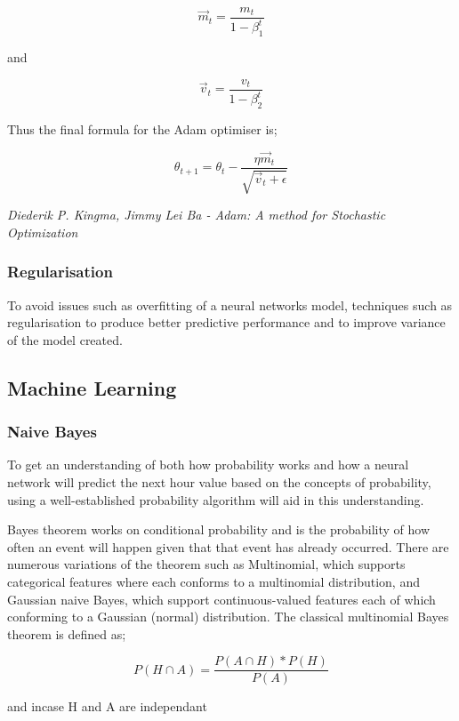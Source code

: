 \documentclass[oneside, 12pt]{article}
\begin{document}
\begin{itemize}
				\[ \vec{m}_t = \frac{m_t}{1 - \beta^t_1} \] 
				\begin{center}
					and
				\end{center}				
				\[\vec{v}_t = \frac{v_t}{1 - \beta^t_2} \]
				
				Thus the final formula for the Adam optimiser is;
				
				\[\theta_{t+1} = \theta_t - \frac{\eta \vec{m}_t}{\sqrt{\vec{v}_t + \epsilon}} \]
				
				\begin{center}
					\textit{Diederik P. Kingma, Jimmy Lei Ba - Adam: A method for Stochastic Optimization}\cite{Adam}
				\end{center}
			\end{itemize}
		
		\subsubsection{Regularisation}
		To avoid issues such as overfitting of a neural networks model, techniques such as regularisation to produce better predictive performance and to improve variance of the model created. \cite{RegularisationSc}
		
		\subsection{Machine Learning}\label{machine}
			\subsubsection{Naive Bayes}
			To get an understanding of both how probability works and how a neural network will predict the next hour value based on the concepts of probability, using a well-established probability algorithm will aid in this understanding.
			
			Bayes theorem works on conditional probability and is the probability of how often an event will happen given that that event has already occurred. There are numerous variations of the theorem such as Multinomial, which supports categorical features where each conforms to a multinomial distribution, and Gaussian naive Bayes, which support continuous-valued features each of which conforming to a Gaussian (normal) distribution. The classical multinomial Bayes theorem is defined as; \cite{StudyNBC}
			
			\[P(H\cap A) = \frac{P(A\cap H) * P(H)}{P(A)} \] 
			
			\begin{center}
				and incase H and A are independant
			\end{center}
		
\end{document}
